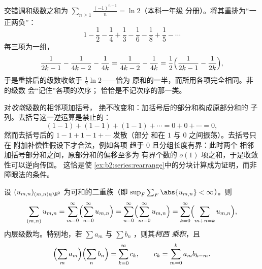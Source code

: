 \begin{example}[一个被当场抓获的重排]\label{ex:b2:series:rearrange}
交错调和级数之和为
$\sum_{n\geq1}\frac{(-1)^{n-1}}{n} = \ln 2$（本科一年级
分册）。将其重排为“一正两负”：
\[
1 - \frac12 - \frac14 + \frac13 - \frac16 - \frac18 + \frac15 -
\cdots
\]
每三项为一组，
\[
\frac{1}{2k-1} - \frac{1}{4k-2} - \frac1{4k}
= \frac{1}{4k-2} - \frac{1}{4k}
= \frac12\Bigl(\frac{1}{2k-1} - \frac1{2k}\Bigr),
\]
于是重排后的级数收敛于 $\frac12\ln 2$——恰为
原和的一半，而所用各项完全相同。非的级数
会“记住”各项的次序；
恰恰是不记次序的那一类。
\end{example}

\begin{example}\label{ex:b2:series:grouping}
对\emph{收敛}级数的相邻项加括号，
绝不改变和：加括号后的部分和构成原部分和的
子列。去括号这一逆运算是禁止的：
\[
(1 - 1) + (1 - 1) + (1 - 1) + \cdots = 0 + 0 + \cdots = 0,
\]
然而去括号后的 $1 - 1 + 1 - 1 + \cdots$ 发散（部分
和在 $1$ 与 $0$ 之间振荡）。去括号只在
附加补偿性假设下才合法，例如各项
趋于 $0$ 且分组长度有界：此时两个
相邻加括号部分和之间，原部分和的偏移至多为
有界个数的 $o(1)$ 项之和，于是收敛性可以逆向传回。
这恰是使
\cref{ex:b2:series:rearrange}中的分块计算成为证明，而非
障眼法的条件。
\end{example}

\begin{theorem}\label{thm:b2:series:fubini}
设 $(u_{m,n})_{(m,n) \in \N^2}$ 为可和的二重族（即
$\sup_F \sum_F \abs{u_{m,n}} < \infty$）。则
\[
\sum_{(m,n)} u_{m,n}
= \sum_{m=0}^{\infty}\Bigl(\sum_{n=0}^{\infty} u_{m,n}\Bigr)
= \sum_{n=0}^{\infty}\Bigl(\sum_{m=0}^{\infty} u_{m,n}\Bigr)
= \sum_{k=0}^{\infty}\Bigl(\sum_{m+n=k} u_{m,n}\Bigr),
\]
内层级数均。特别地，若 $\sum
a_m$ 与 $\sum b_n$ ，则其\emph{柯西
乘积}，且
\[
\Bigl(\sum_m a_m\Bigr)\Bigl(\sum_n b_n\Bigr)
= \sum_{k=0}^{\infty} c_k,
\qquad
c_k = \sum_{m=0}^{k} a_m b_{k-m} .
\]
\end{theorem}


